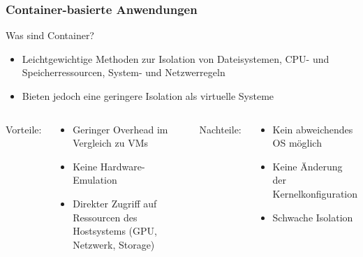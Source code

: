 \begin{frame}
\frametitle{Container-basierte Anwendungen}

Was sind Container?
\begin{itemize}
	\item Leichtgewichtige Methoden zur Isolation von Dateisystemen, CPU- und Speicherressourcen, System- und Netzwerregeln
	\item Bieten jedoch eine geringere Isolation als virtuelle Systeme
\end{itemize}

\begin{columns}[T]
	Vorteile:
	\begin{center}
		\begin{itemize}
			\item Geringer Overhead im Vergleich zu VMs
			\item Keine Hardware-Emulation
			\item Direkter Zugriff auf Ressourcen des Hostsystems (GPU, Netzwerk, Storage) 
		\end{itemize}
	\end{center}
	Nachteile:
	\begin{center}
		\begin{itemize}
			\item Kein abweichendes OS möglich
			\item Keine Änderung der Kernelkonfiguration
			\item Schwache Isolation
		\end{itemize} 
	\end{center}
\end{columns}

\end{frame}



